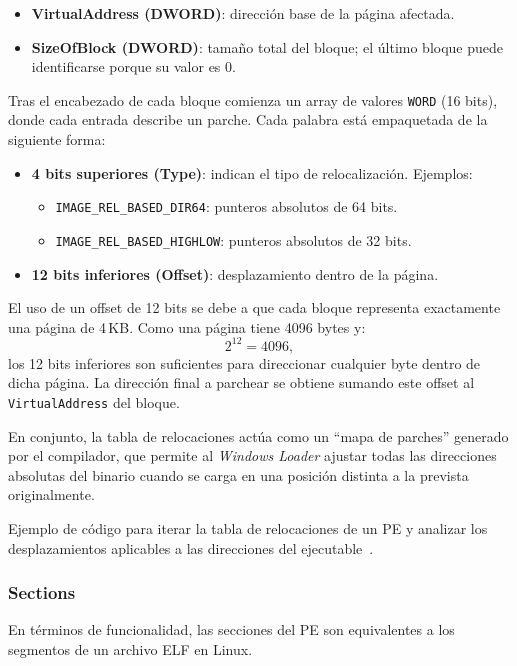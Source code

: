 \begin{itemize}
    \item \textbf{VirtualAddress (DWORD)}: dirección base de la página afectada.
    \item \textbf{SizeOfBlock (DWORD)}: tamaño total del bloque; el último bloque puede identificarse porque su valor es 0.
\end{itemize}

Tras el encabezado de cada bloque comienza un array de valores \texttt{WORD} (16 bits), donde cada entrada describe un parche. Cada palabra está empaquetada de la siguiente forma:

\begin{itemize}
    \item \textbf{4 bits superiores (Type)}: indican el tipo de relocalización. Ejemplos:
        \begin{itemize}
            \item \texttt{IMAGE\_REL\_BASED\_DIR64}: punteros absolutos de 64 bits.
            \item \texttt{IMAGE\_REL\_BASED\_HIGHLOW}: punteros absolutos de 32 bits.
        \end{itemize}
    \item \textbf{12 bits inferiores (Offset)}: desplazamiento dentro de la página.
\end{itemize}

El uso de un offset de 12 bits se debe a que cada bloque representa exactamente una página de 4\,KB.  
Como una página tiene 4096 bytes y:
\[
2^{12} = 4096,
\]
los 12 bits inferiores son suficientes para direccionar cualquier byte dentro de dicha página.  
La dirección final a parchear se obtiene sumando este offset al \texttt{VirtualAddress} del bloque.

En conjunto, la tabla de relocaciones actúa como un “mapa de parches” generado por el compilador, que permite al \textit{Windows Loader} ajustar todas las direcciones absolutas del binario cuando se carga en una posición distinta a la prevista originalmente.

Ejemplo de código para iterar la tabla de relocaciones de un PE y analizar los desplazamientos aplicables a las direcciones del ejecutable~\cite{walking_PE_relocs}.

\subsubsection{Sections}

En términos de funcionalidad, las secciones del PE son equivalentes a los segmentos de un archivo ELF en Linux.

